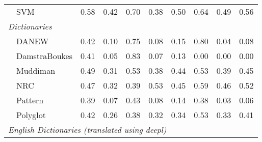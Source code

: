 \begin{tabularx}{\textwidth}{lXXrrrrrrrr}
 & \multicolumn{2}{l}{ SVM }& \cellcolor[gray]{0.71} 0.58& \cellcolor[gray]{0.79} 0.42& \cellcolor[gray]{0.65} 0.70& \cellcolor[gray]{0.81} 0.38& \cellcolor[gray]{0.75} 0.50& \cellcolor[gray]{0.68} 0.64& \cellcolor[gray]{0.75} 0.49& \cellcolor[gray]{0.72} 0.56\\


\multicolumn{11}{l}{\emph{ Dictionaries }} \\

 & \multicolumn{2}{l}{ DANEW }& \cellcolor[gray]{0.79} 0.42& \cellcolor[gray]{0.95} 0.10& \cellcolor[gray]{0.62} 0.75& \cellcolor[gray]{0.96} 0.08& \cellcolor[gray]{0.93} 0.15& \cellcolor[gray]{0.60} 0.80& \cellcolor[gray]{0.98} 0.04& \cellcolor[gray]{0.96} 0.08\\

 & \multicolumn{2}{l}{ DamstraBoukes }& \cellcolor[gray]{0.80} 0.41& \cellcolor[gray]{0.97} 0.05& \cellcolor[gray]{0.58} 0.83& \cellcolor[gray]{0.97} 0.07& \cellcolor[gray]{0.94} 0.13& \cellcolor[gray]{1.00} 0.00& \cellcolor[gray]{1.00} 0.00& \cellcolor[gray]{1.00} 0.00\\

 & \multicolumn{2}{l}{ Muddiman }& \cellcolor[gray]{0.76} 0.49& \cellcolor[gray]{0.84} 0.31& \cellcolor[gray]{0.74} 0.53& \cellcolor[gray]{0.81} 0.38& \cellcolor[gray]{0.78} 0.44& \cellcolor[gray]{0.73} 0.53& \cellcolor[gray]{0.80} 0.39& \cellcolor[gray]{0.77} 0.45\\

 & \multicolumn{2}{l}{ NRC }& \cellcolor[gray]{0.76} 0.47& \cellcolor[gray]{0.84} 0.32& \cellcolor[gray]{0.80} 0.39& \cellcolor[gray]{0.73} 0.53& \cellcolor[gray]{0.77} 0.45& \cellcolor[gray]{0.71} 0.59& \cellcolor[gray]{0.77} 0.46& \cellcolor[gray]{0.74} 0.52\\

 & \multicolumn{2}{l}{ Pattern }& \cellcolor[gray]{0.81} 0.39& \cellcolor[gray]{0.97} 0.07& \cellcolor[gray]{0.79} 0.43& \cellcolor[gray]{0.96} 0.08& \cellcolor[gray]{0.93} 0.14& \cellcolor[gray]{0.81} 0.38& \cellcolor[gray]{0.98} 0.03& \cellcolor[gray]{0.97} 0.06\\

 & \multicolumn{2}{l}{ Polyglot }& \cellcolor[gray]{0.79} 0.42& \cellcolor[gray]{0.87} 0.26& \cellcolor[gray]{0.81} 0.38& \cellcolor[gray]{0.84} 0.32& \cellcolor[gray]{0.83} 0.34& \cellcolor[gray]{0.73} 0.53& \cellcolor[gray]{0.83} 0.33& \cellcolor[gray]{0.80} 0.41\\


\multicolumn{11}{l}{\emph{ English Dictionaries (translated using deepl) }} \\


\end{tabularx}
